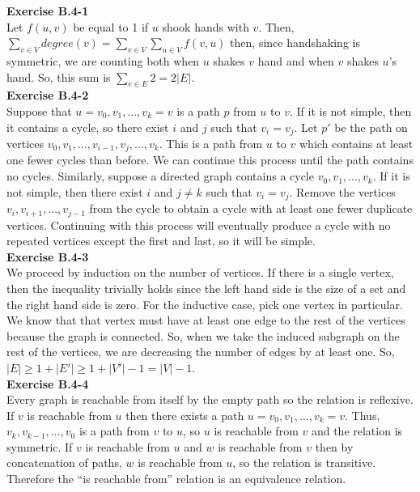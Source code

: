 \documentclass{article}
\begin{document}
\noindent\textbf{Exercise B.4-1}\\
Let $f(u,v)$ be equal to 1 if $u$ shook hands with $v$. Then, $\sum_{v\in V} degree(v) = \sum_{v\in V} \sum_{u\in V} f(v,u)$ then, since handshaking is symmetric, we are counting both when $u$ shakes $v$ hand and when $v$ shakes $u$'s hand. So, this sum is $\sum_{e\in E} 2 = 2|E|$.\\

\noindent\textbf{Exercise B.4-2}\\

Suppose that $u = v_0, v_1, \ldots, v_k = v$ is a path $p$ from $u$ to $v$.  If it is not simple, then it contains a cycle, so there exist $i$ and $j$ such that $v_i = v_j$.  Let $p'$ be the path on vertices $v_0, v_1, \ldots, v_{i-1}, v_j, \ldots, v_k$.  This is a path from $u$ to $v$ which contains at least one fewer cycles than before.  We can continue this process until the path contains no cycles. Similarly, suppose a directed graph contains a cycle $v_0, v_1, \ldots, v_k$.  If it is not simple, then there exist $i$ and $j \neq k$ such that $v_i = v_j$.  Remove the vertices $v_i, v_{i+1}, \ldots, v_{j-1}$ from the cycle to obtain a cycle with at least one fewer duplicate vertices.  Continuing with this process will eventually produce a cycle with no repeated vertices except the first and last, so it will be simple. \\


\noindent\textbf{Exercise B.4-3}\\
We proceed by induction on the number of vertices. If there is a single vertex, then the inequality trivially holds since the left hand side is the size of a set and the right hand side is zero. For the inductive case, pick one vertex in particular. We know that that vertex must have at least one edge to the rest of the vertices because the graph is connected. So, when we take the induced subgraph on the rest of the vertices, we are decreasing the number of edges by at least one. So, $|E| \ge 1+ |E'| \ge 1+ |V'| -1 = |V| -1$.\\

\noindent\textbf{Exercise B.4-4}\\

Every graph is reachable from itself by the empty path so the relation is reflexive.  If $v$ is reachable from $u$ then there exists a path $u = v_0, v_1, \ldots, v_k = v$.  Thus, $v_k, v_{k-1}, \ldots, v_0$ is a path from $v$ to $u$, so $u$ is reachable from $v$ and the relation is symmetric.  If $v$ is reachable from $u$ and $w$ is reachable from $v$ then by concatenation of paths, $w$ is reachable from $u$, so the relation is transitive.  Therefore the ``is reachable from'' relation is an equivalence relation. \\
\end{document}

